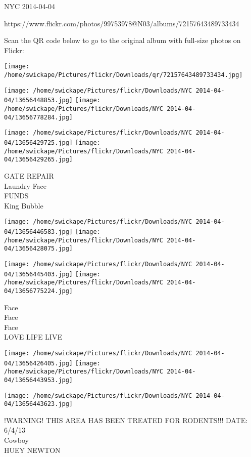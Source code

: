 \documentclass[10pt,letterpaper]{article}
\begin{document}
NYC 2014-04-04

https://www.flickr.com/photos/99753978@N03/albums/72157643489733434

Scan the QR code below to go to the original album with full-size photos on Flickr:

\texttt{[image: /home/swickape/Pictures/flickr/Downloads/qr/72157643489733434.jpg]}
\pagebreak

\texttt{[image: /home/swickape/Pictures/flickr/Downloads/NYC 2014-04-04/13656448853.jpg]}
\texttt{[image: /home/swickape/Pictures/flickr/Downloads/NYC 2014-04-04/13656778284.jpg]}

\texttt{[image: /home/swickape/Pictures/flickr/Downloads/NYC 2014-04-04/13656429725.jpg]}
\texttt{[image: /home/swickape/Pictures/flickr/Downloads/NYC 2014-04-04/13656429265.jpg]}

GATE REPAIR\\
Laundry Face\\
FUNDS\\
King Bubble\\
\pagebreak

\texttt{[image: /home/swickape/Pictures/flickr/Downloads/NYC 2014-04-04/13656446583.jpg]}
\texttt{[image: /home/swickape/Pictures/flickr/Downloads/NYC 2014-04-04/13656428075.jpg]}

\texttt{[image: /home/swickape/Pictures/flickr/Downloads/NYC 2014-04-04/13656445403.jpg]}
\texttt{[image: /home/swickape/Pictures/flickr/Downloads/NYC 2014-04-04/13656775224.jpg]}

Face\\
Face\\
Face\\
LOVE LIFE LIVE\\
\pagebreak

\texttt{[image: /home/swickape/Pictures/flickr/Downloads/NYC 2014-04-04/13656426405.jpg]}
\texttt{[image: /home/swickape/Pictures/flickr/Downloads/NYC 2014-04-04/13656443953.jpg]}

\vspace{0.25in}
\texttt{[image: /home/swickape/Pictures/flickr/Downloads/NYC 2014-04-04/13656443623.jpg]}

!WARNING! THIS AREA HAS BEEN TREATED FOR RODENTS!!! DATE: 6/4/13\\
Cowboy\\
HUEY NEWTON\\
\pagebreak
\end{document}
